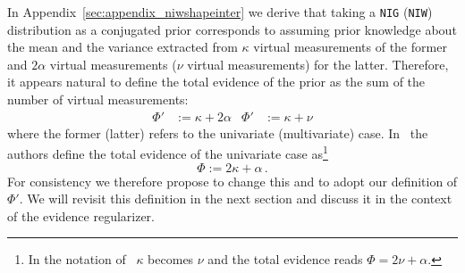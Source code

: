 \documentclass{article}
\begin{document}
In Appendix~\ref{sec:appendix_niwshapeinter} we derive that taking a \texttt{NIG} (\texttt{NIW}) distribution as a conjugated prior corresponds to assuming prior knowledge about the mean and the variance extracted from $\kappa$ virtual measurements of the former and $2\alpha$ virtual measurements ($\nu$ virtual measurements) for the latter.
Therefore, it appears natural to define the total evidence of the prior as the sum of the number of virtual measurements:
\begin{align}
    \Phi' &:= \kappa + 2\alpha &
    \Phi' &:= \kappa + \nu
\end{align}
where the former (latter) refers to the univariate (multivariate) case.
In~\cite{amini20} the authors define the total evidence of the univariate case as\footnote{In the notation of~\cite{amini20} $\kappa$ becomes $\nu$ and the total evidence reads $\Phi = 2\nu + \alpha$.}
\begin{equation}
    \Phi := 2 \kappa + \alpha \,.
\end{equation}
For consistency we therefore propose to change this and to adopt our definition of $\Phi'$.
We will revisit this definition in the next section and discuss it in the context of the evidence regularizer.
\end{document}
